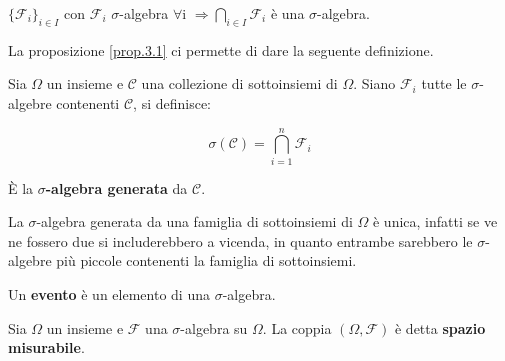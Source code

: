 \begin{proposition}
\label{prop.3.1}
$\{\mathscr{F}_i\}_{i\in I}$ con $\mathscr{F}_i$ $\sigma$-algebra $\forall$i $\Rightarrow \bigcap\limits_{i\in I}\mathscr{F}_i $ è una $\sigma$-algebra.   
\end{proposition}
La proposizione \ref{prop.3.1} ci permette di dare la seguente definizione.
\begin{definition}
Sia $\Omega$ un insieme e $\mathscr{C}$ una collezione di sottoinsiemi di $\Omega$. Siano $\mathscr{F}_i$ tutte le $\sigma$-algebre contenenti $\mathscr{C}$, si definisce:
\begin{center}
\begin{displaymath}
  \sigma(\mathscr{C})=\bigcap\limits^n_{i=1}\mathscr{F}_i
\end{displaymath}    
\end{center}
\`E la \textbf{$\sigma$-algebra generata} da $\mathscr{C}$.
\end{definition}

La $\sigma$-algebra generata da una famiglia di sottoinsiemi di $\Omega$ è unica, infatti se ve ne fossero due si includerebbero a vicenda, in quanto entrambe sarebbero le $\sigma$-algebre più piccole contenenti la famiglia di sottoinsiemi. 

\begin{definition}
Un \textbf{evento} è un elemento di una $\sigma$-algebra.
\end{definition}

\begin{definition}
Sia $\Omega$ un insieme e $\mathscr{F}$ una $\sigma$-algebra su $\Omega$. La coppia $(\Omega , \mathscr{F})$ è detta \textbf{spazio misurabile}.
\end{definition}

